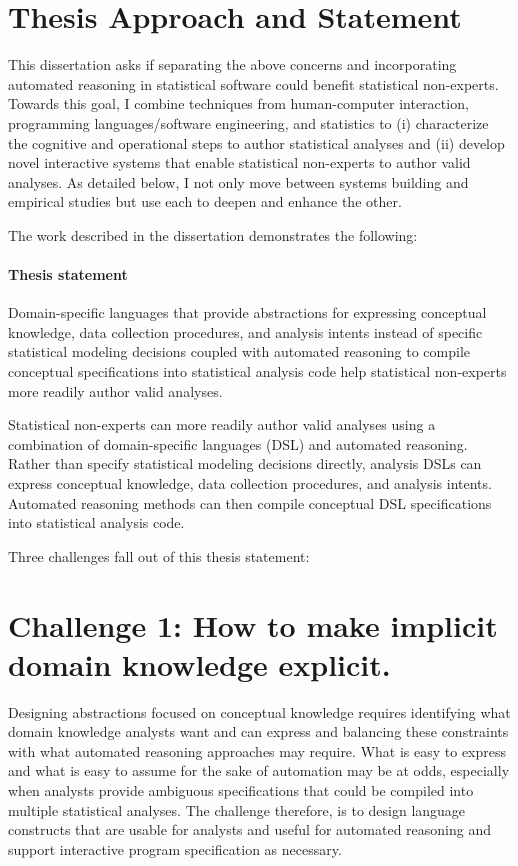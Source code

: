 \section{Thesis Approach and Statement}
This dissertation asks if separating the above concerns and incorporating
automated reasoning in statistical software could benefit statistical
non-experts. Towards this goal, I combine techniques from human-computer
interaction, programming languages/software engineering, and statistics to (i)
characterize the cognitive and operational steps to author statistical analyses
and (ii) develop novel interactive systems that enable statistical non-experts
to author valid analyses. As detailed below, I not only move between systems
building and empirical studies but use each to deepen and enhance the other.

The work described in the dissertation demonstrates the following:%
\paragraph{Thesis statement} \label{para:thesisStatement}

Domain-specific languages that provide abstractions for expressing conceptual
knowledge, data collection procedures, and analysis intents instead of specific
statistical modeling decisions coupled with automated reasoning to compile
conceptual specifications into statistical analysis code help statistical
non-experts more readily author valid analyses. 

Statistical non-experts can more readily author valid analyses using a
combination of domain-specific languages (DSL) and automated reasoning. Rather
than specify statistical modeling decisions directly, analysis DSLs can express
conceptual knowledge, data collection procedures, and analysis intents.
Automated reasoning methods can then compile conceptual DSL specifications into
statistical analysis code.

Three challenges fall out of this thesis statement: 

\section*{Challenge 1: How to make implicit domain knowledge explicit.} %
Designing abstractions focused on conceptual knowledge requires identifying what
domain knowledge analysts want and can express and balancing these constraints
with what automated reasoning approaches may require. What is easy to express
and what is easy to assume for the sake of automation may be at odds, especially
when analysts provide ambiguous specifications that could be compiled into
multiple statistical analyses. The challenge therefore, is to design language
constructs that are usable for analysts and useful for automated reasoning and
support interactive program specification as necessary.

